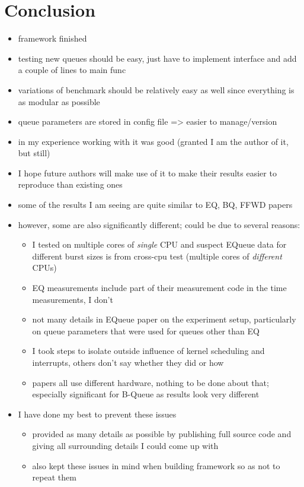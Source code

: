 \section{Conclusion}
\begin{itemize}
    \item framework finished
    \item testing new queues should be easy, just have to implement interface and add a couple of lines to main func
    \item variations of benchmark should be relatively easy as well since everything is as modular as possible
    \item queue parameters are stored in config file => easier to manage/version
    \item in my experience working with it was good (granted I am the author of it, but still)
    \item I hope future authors will make use of it to make their results easier to reproduce than existing ones

    \item some of the results I am seeing are quite similar to EQ, BQ, FFWD papers
    \item however, some are also significantly different; could be due to several reasons:
        \begin{itemize}
            \item I tested on multiple cores of \textit{single} CPU and suspect EQueue data for different burst sizes is from cross-cpu test (multiple cores of \textit{different} CPUs)
            \item EQ measurements include part of their measurement code in the time measurements, I don't
            \item not many details in EQueue paper on the experiment setup, particularly on queue parameters
                that were used for queues other than EQ
            \item I took steps to isolate outside influence of kernel scheduling and interrupts, others don't say whether they did or how
            \item papers all use different hardware, nothing to be done about that; especially significant for B-Queue as results look very different 
        \end{itemize}
    \item I have done my best to prevent these issues
        \begin{itemize}
            \item provided as many details as possible by publishing full source code and giving all surrounding details I could come up with
            \item also kept these issues in mind when building framework so as not to repeat them
        \end{itemize}


\end{itemize}
